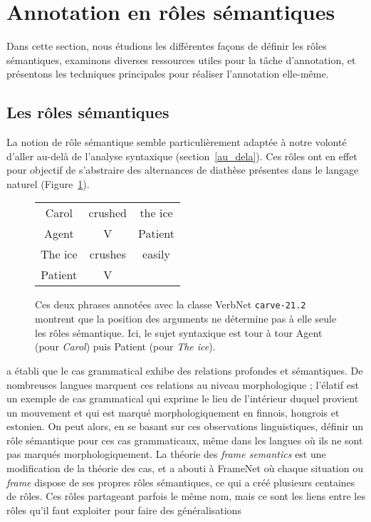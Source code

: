 \section{Annotation en rôles sémantiques}
\label{sec:srl}

Dans cette section, nous étudions les différentes façons de définir les rôles
sémantiques, examinons diverses ressources utiles pour la tâche d'annotation,
et présentons les techniques principales pour réaliser l'annotation elle-même.

\subsection{Les rôles sémantiques}
\label{subsec:roles_semantiques}

La notion de rôle sémantique semble particulièrement adaptée à notre volonté
d'aller au-delà de l'analyse syntaxique (section~\ref{au_dela}). Ces rôles ont
en effet pour objectif de s'abstraire des alternances de diathèse présentes
dans le langage naturel (Figure~\ref{fig:exemple_srl}).

\begin{figure}[ht]
    \centering
    \begin{tabular}{ccc}
        \toprule
        Carol & crushed   & the ice \\
        Agent & V         & Patient \\
        \midrule
        The ice & crushes & easily  \\
        Patient & V       &         \\
        \bottomrule
    \end{tabular}

    \caption{\label{fig:exemple_srl}Ces deux phrases annotées avec la classe
    VerbNet \texttt{carve-21.2} montrent que la position des arguments ne
détermine pas à elle seule les rôles sémantique. Ici, le sujet syntaxique est
tour à tour Agent (pour \textit{Carol}) puis Patient (pour \textit{The ice}).}
\end{figure}

\cite{fillmore1968case} a établi que le cas grammatical exhibe des relations
profondes et sémantiques. De nombreuses langues marquent ces relations au
niveau morphologique ; l'élatif est un exemple de cas grammatical qui exprime
le lieu de l'intérieur duquel provient un mouvement et qui est marqué
morphologiquement en finnois, hongrois et estonien. On peut alors, en se basant
sur ces observations linguistiques, définir un rôle sémantique pour ces cas
grammaticaux, même dans les langues où ils ne sont pas marqués
morphologiquement. La théorie des \textit{frame semantics}
\citep{fillmore1982frame} est une modification de la théorie des cas, et a
abouti à FrameNet où chaque situation ou \textit{frame} dispose de ses propres
rôles sémantiques, ce qui a créé plusieurs centaines de rôles. Ces rôles
partageant parfois le même nom, mais ce sont les liens entre les rôles qu'il
faut exploiter pour faire des généralisations \citep{litkowski2014framenet}

